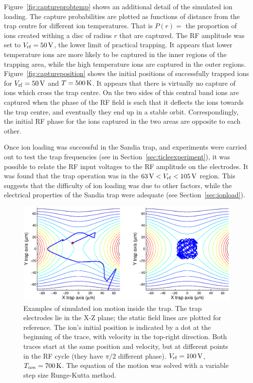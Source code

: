 Figure~\ref{fig:captureprobtemp} shows an additional detail of the simulated ion loading. The capture probabilities are plotted as functions of distance from the trap centre for different ion temperatures. That is $P(r) =$ the proportion of ions created withing a disc of radius $r$ that are captured. The RF amplitude was set to $V_{\rm rf} = 50\,\mbox{V}$, the lower limit of practical trapping. It appears that lower temperature ions are more likely to be captured in the inner regions of the trapping area, while the high temperature ions are captured in the outer regions. Figure~\ref{fig:captureposition} shows the initial positions of successfully trapped ions for $V_{\rm rf} = 50\,\mbox{V}$ and $T = 500\,\mbox{K}$. It appears that there is virtually no capture of ions which cross the trap centre. On the two sides of this central band ions are captured when the phase of the RF field is such that it deflects the ions towards the trap centre, and eventually they end up in a stable orbit. Correspondingly, the initial RF phase for the ions captured in the two areas are opposite to each other. 

Once ion loading was successful in the Sandia trap, and experiments were carried out to test the trap frequencies (see in Section~\ref{sec:ticleexperiment}), it was possible to relate the RF input voltages to the RF amplitude on the electrodes. It was found that the trap operation was in the $63\,\mbox{V}<V_{\rm rf}<105\,\mbox{V}$ region. This suggests that the difficulty of ion loading was due to other factors, while the electrical properties of the Sandia trap were adequate (see Section~\ref{sec:ionload}).


 \begin{figure}[h!t]
 \centering
 \includegraphics[width=14.5cm]{chapter3/tempcapture/motion_combined_v3}
 \caption[Trapped and non-trapped ion trajectories in Sandia trap]{Examples of simulated ion motion inside the trap. The trap electrodes lie in the X-Z plane; the static field lines are plotted for reference. The ion's initial position is indicated by a dot at the beginning of the trace, with velocity in the top-right direction. Both traces start at the same position and velocity, but at different points in the RF cycle (they have $\pi/2$ different phase). $V_{\rm rf} = 100\,\mbox{V}$, $T_{ion} = 700\,\mbox{K}$. The equation of the motion was solved with a variable step size Runge-Kutta method.}
 \label{fig:sampletraptrace}
 \end{figure} 


